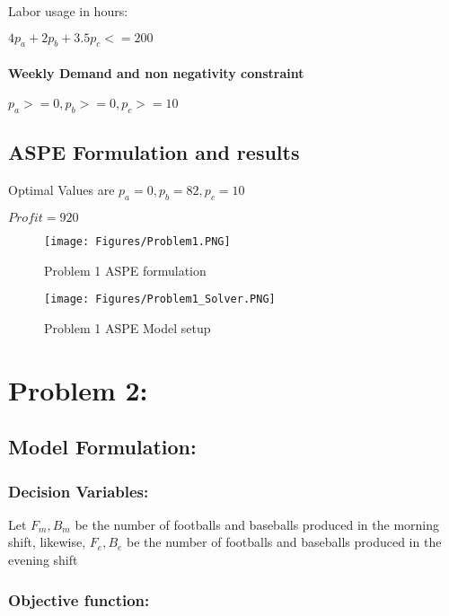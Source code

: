 \documentclass[]{article}
\let\oldparagraph\paragraph
\renewcommand{\paragraph}[1]{\oldparagraph{#1}\mbox{}}
\begin{document}
Labor usage in hours:

\(4p_{a} + 2p_{b} + 3.5p_{c} <= 200\)

\paragraph{Weekly Demand and non negativity
constraint}\label{weekly-demand-and-non-negativity-constraint}

\(p_{a} >= 0, p_{b} >= 0 ,p_{c} >= 10\)

\subsection{ASPE Formulation and
results}\label{aspe-formulation-and-results}

Optimal Values are \(p_{a} = 0, p_{b} = 82 ,p_{c} = 10\)

\(Profit = 920\)

\begin{figure}
\centering
\texttt{[image: Figures/Problem1.PNG]}
\caption{Problem 1 ASPE formulation}
\end{figure}

\begin{figure}
\centering
\texttt{[image: Figures/Problem1\_Solver.PNG]}
\caption{Problem 1 ASPE Model setup}
\end{figure}

\pagebreak

\section{Problem 2:}\label{problem-2}

\subsection{Model Formulation:}\label{model-formulation-1}

\subsubsection{Decision Variables:}\label{decision-variables-1}

Let \(F_{m},B_{m}\) be the number of footballs and baseballs produced in
the morning shift, likewise, \(F_{e},B_{e}\) be the number of footballs
and baseballs produced in the evening shift

\subsubsection{Objective function:}\label{objective-function-1}
\end{document}
